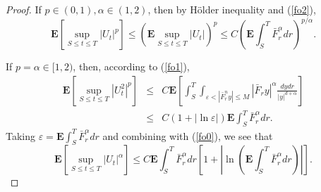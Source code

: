 \documentclass[11pt]{amsart}
\theoremstyle{plain}
\numberwithin{equation}{section}
\begin{document}
\begin{proof}
If $p\in \left( 0,1\right) ,\alpha \in \left( 1,2\right) $, then by H\"{o}lder inequality and (\ref{fo2}),\begin{equation*}
\mathbf{E}\left[ \sup_{S\leq t\leq T}\left\vert U_{t}\right\vert ^{p}\right]
\leq \left( \mathbf{E}\sup_{S\leq t\leq T}\left\vert U_{t}\right\vert
\right) ^{p}\leq C\left( \mathbf{E}\int_{S}^{T}\bar{F}_{r}^{\alpha
}dr\right) ^{p/\alpha }.
\end{equation*}

If $p=\alpha \in \lbrack 1,2)$, then, according to (\ref{fo1}),\begin{eqnarray*}
\mathbf{E}\left[ \sup_{S\leq t\leq T}\left\vert U_{t}^{2}\right\vert ^{p}\right] &\leq &C\mathbf{E}\left[ \int_{S}^{T}\int_{\varepsilon< \left\vert 
\bar{F}_{r}^{n}y\right\vert \leq M }\left\vert \bar{F}_{r}y\right\vert
^{\alpha }\frac{dydr}{\left\vert y\right\vert ^{d+\alpha }}\right] \\
&\leq &C\left( 1+|\ln \varepsilon |\right)\mathbf{E}\int_{S}^{T}\bar{F}_{r}^{\alpha }dr .
\end{eqnarray*}Taking $\varepsilon =\mathbf{E}\int_{S}^{T}\bar{F}_{r}^{\alpha }dr$ and
combining with (\ref{fo0}), we see that 
\begin{equation*}
\mathbf{E}\left[ \sup_{S\leq t\leq T}\left\vert U_{t}\right\vert ^{\alpha }\right] \leq C\mathbf{E}\int_{S}^{T}\bar{F}_{r}^{\alpha }dr\left[ 1+|\ln
\left( \mathbf{E}\int_{S}^{T}\bar{F}_{r}^{\alpha }dr\right) |\right] .
\end{equation*}
\end{proof}
\end{document}
